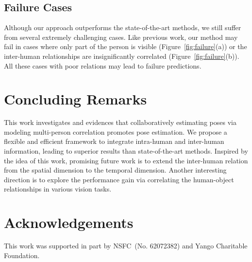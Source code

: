 \documentclass{article}
\begin{document}
\subsection{Failure Cases}
Although our approach outperforms the state-of-the-art methods, we still suffer from several extremely challenging cases. Like previous work, our method may fail in cases where only part of the person is visible (Figure~\ref{fig:failure}(a)) or the inter-human relationships are insignificantly correlated (Figure~\ref{fig:failure}(b)). All these cases with poor relations may lead to failure predictions.

\section{Concluding Remarks}




This work investigates and evidences that collaboratively estimating poses via modeling multi-person correlation promotes pose estimation. We propose a flexible and efficient framework to integrate intra-human and inter-human information, leading to superior results than state-of-the-art methods. Inspired by the idea of this work, promising future work is to extend the inter-human relation from the spatial dimension to the temporal dimension. Another interesting direction is to explore the performance gain via correlating the human-object relationships in various vision tasks.

\section*{Acknowledgements}
This work was supported in part by NSFC~(No. 62072382) and Yango Charitable Foundation.

\appendix








\end{document}
